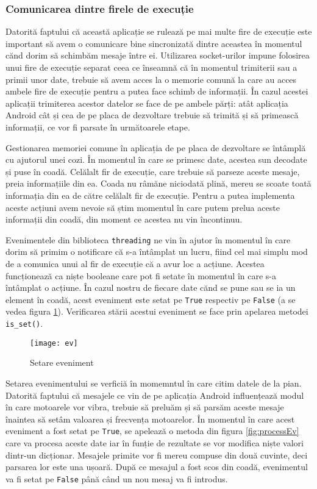 \documentclass[../IoMusT.tex]{subfiles}
\begin{document}
\subsubsection{Comunicarea dintre firele de execuție} 
Datorită faptului că această aplicație se rulează pe mai multe fire de execuție este important să avem o comunicare bine sincronizată dintre aceastea în momentul cănd dorim să schimbăm mesaje între ei. Utilizarea socket-urilor impune folosirea unui fire de execuție separat ceea ce înseamnă că în momentul trimiterii sau a primii unor date, trebuie să avem acces la o memorie comună la care au acces ambele fire de execuție pentru a putea face schimb de informații. În cazul acestei aplicații trimiterea acestor datelor se face de pe ambele părți: atât aplicația Android cât și cea de pe placa de dezvoltare trebuie să trimită și să primească informații, ce vor fi parsate în următoarele etape.
\\
\par Gestionarea memoriei comune în aplicația de pe placa de dezvoltare se întâmplă cu ajutorul unei cozi. În momentul în care se primesc date, acestea sun decodate și puse în coadă. Celălalt fir de execuție, care trebuie să parseze aceste mesaje, preia informațiile din ea. Coada nu râmăne niciodată plină, mereu se scoate toată informația din ea de către celălalt fir de execuție. Pentru a putea implementa aceste acțiuni avem nevoie să știm momentul în care putem prelua aceste informații din coadă, din moment ce acestea nu vin încontinuu.
\\
\par Evenimentele din biblioteca \verb|threading| ne vin în ajutor în momentul în care dorim să primim o notificare că s-a întâmplat un lucru, fiind cel mai simplu mod de a comunica unui al fir de execuție că a avur loc a acțiune. Acestea funcționează ca niște booleane care pot fi setate în momentul în care s-a întâmplat o acțiune. În cazul nostru de fiecare date cănd se pune sau se ia un element în coadă, acest eveniment este setat pe \verb|True| respectiv pe \verb|False|  (a se vedea figura \ref{fig:ev}). Verificarea stării acestui eveniment se face prin apelarea metodei \verb|is_set()|.
\begin{figure}[h]
\centering
\texttt{[image: ev]}
\caption{Setare eveniment}
\label{fig:ev}
\end{figure}  
Setarea evenimentului se verficiă în momemntul în care citim datele de la pian. Datorită faptului că mesajele ce vin de pe aplicația Android influențează modul în care motoarele vor vibra, trebuie să preluăm și să parsăm aceste mesaje înaintea să setâm valoarea și frecvența motoarelor. În momentul în care acest eveniment a fost setat pe \verb|True|, se apelează o metoda din figura \ref{fig:processEv} care va procesa aceste date iar în funție de rezultate se vor modifica niște valori dintr-un dicționar. Mesajele primite vor fi mereu compuse din două cuvinte, deci parsarea lor este una ușoară. După ce mesajul a fost scos din coadă, evenimentul va fi setat pe \verb|False| până când un nou mesaj va fi introdus.
\end{document}
